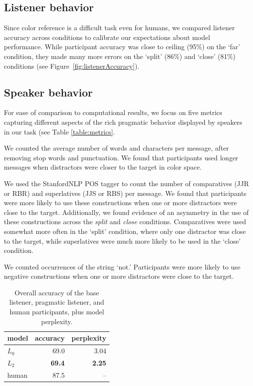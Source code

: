 \documentclass[11pt,letterpaper]{article}
\newcommand{\Listener}{L}
\renewcommand{\|}{\mid}
\newcommand{\best}[1]{\textbf{#1}}
\newcommand{\figref}[1]{Figure~\ref{#1}}
\begin{document}
\subsection{Listener behavior}

Since color reference is a difficult task even for humans, we compared listener accuracy across conditions to calibrate our expectations about model performance. While participant accuracy was close to ceiling (95\%) on the `far' condition, they made many more errors on the `split' (86\%) and `close' (81\%) conditions (see \figref{fig:listenerAccuracy}).

\subsection{Speaker behavior}

For ease of comparison to computational results, we focus on five metrics capturing different aspects of the rich pragmatic behavior displayed by speakers in our task (see Table \ref{table:metrics}. 

 We counted the average number of words and characters per message, after removing stop words and punctuation. We found that participants used longer messages when distractors were closer to the target in color space.

 We used the StanfordNLP POS tagger to count the number of comparatives (JJR or RBR) and superlatives (JJS or RBS) per message. We found that participants were more likely to use these constructions when one or more distractors were close to the target. Additionally, we found evidence of an asymmetry in the use of these constructions across the \emph{split} and \emph{close} conditions. Comparatives were used somewhat more often in the `split' condition, where only one distractor was close to the target, while superlatives were much more likely to be used in the `close' condition.

 We counted occurrences of the string `not.' Participants were more likely to use negative constructions when one or more distractors were close to the target.

\begin{table}[t]
\centering
\begin{tabular}{lrr}
  \hline
  model & accuracy & perplexity \\
  \hline
  $\Listener_0$ & 69.0 & 3.04 \\
  $\Listener_2$ & \best{69.4} & \best{2.25} \\
  \hline
  human & 87.5 & -- \\
   \hline
\end{tabular}
\caption{Overall accuracy of the base listener, pragmatic listener, and human participants, plus model perplexity.}
\label{table:overallAccuracy}
\end{table}
\end{document}
